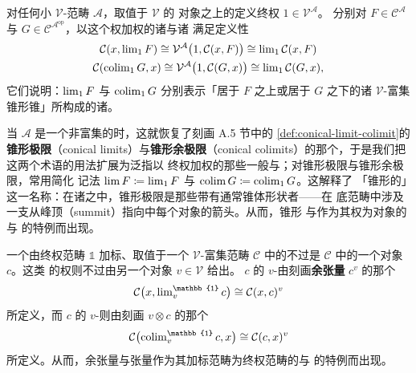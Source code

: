 \begin{example}[锥形极限与余极限]\label{exa:conical-limits-colimits}
对任何小 $\mathcal{V}$-范畴 $\mathcal{A}$，取值于 $\mathcal{V}$ 的%
\trTerminal{}对象之上的\trConstantFunctor{}定义终权 $1\in\mathcal{V}^{\mathcal{A}}$。
分别对\trDiagram{} $F\in\mathcal{C}^{\mathcal{A}}$ 与
$G\in\mathcal{C}^{\mathcal{A}^{\mathrm{op}}}$，以这个权加权的诸\trLimit{}与诸%
\trColimit{}满足定义性\trUniversalProperty
\begin{gather*}
\mathcal{C}(x,\operatorname{lim}_{1}F)\cong\mathcal{V}^{\mathcal{A}}\bigl(1,\mathcal{C}(x,F)\bigr)
  \cong\operatorname{lim}_{1}\mathcal{C}(x,F)\\
\mathcal{C}(\operatorname{colim}_{1}G,x)\cong\mathcal{V}^{\mathcal{A}}\bigl(1,\mathcal{C}(G,x)\bigr)
  \cong\operatorname{lim}_{1}\mathcal{C}(G,x),
\end{gather*}
它们说明：$\operatorname{lim}_{1}F$ 与 $\operatorname{colim}_{1}G$ 分别表示「居于 $F$ 之上或居于 $G$
之下的诸 $\mathcal{V}$-富集锥形锥」所构成的诸\trFunctor。

当 $\mathcal{A}$ 是一个非富集的\trCategory{}时，这就恢复了刻画 A.5 节中的%
\cref{def:conical-limit-colimit}的\textbf{锥形极限}（conical limits）与\textbf{锥形余极限}（conical
colimits）的那个\trUniversalProperty，于是我们把这两个术语的用法扩展为泛指以%
终权加权的那些一般\trLimit{}与\trColimit；对锥形极限与锥形余极限，常用简化%
记法 $\operatorname{lim} F\coloneqq\operatorname{lim}_{1}F$ 与 $\operatorname{colim} G\coloneqq\operatorname{colim}_{1}G$。这解释了
「锥形的」这一名称：在诸\trWeightedLimit{}之中，锥形极限是那些带有通常锥体形状者——在
底范畴中涉及一支从峰顶（summit）指向\trDiagram{}中每个对象的箭头。从而，锥形%
\trLimit{}与\trColimit{}作为其权为\trTerminal{}对象的\trWeightedLimit{}与%
\trWeightedColimit{}的特例而出现。
\end{example}

\begin{example}[张量与余张量]\label{exa:tensors-and-cotensors}
一个由终权范畴 $\mathbb{1}$ 加标、取值于一个 $\mathcal{V}$-富集范畴
$\mathcal{C}$ 中的\trDiagram{}不过是 $\mathcal{C}$ 中的一个对象 $c$。这类%
\trDiagram{}的权则不过由另一个对象 $v\in\mathcal{V}$ 给出。\trDiagram{} $c$ 的
$v$-\trWeightedLimit{}由刻画\textbf{余张量} $c^{v}$ 的那个\trUniversalProperty
\[ \mathcal{C}\bigl(x,\wlim^{\mathbb{1}}_{v}c\bigr)\cong\mathcal{C}(x,c)^{v} \]
所定义，而\trDiagram{} $c$ 的 $v$-\trWeightedColimit{}则由刻画\textbf{\trTensor}
$v\otimes c$ 的那个\trUniversalProperty
\[ \mathcal{C}\bigl(\wcolim^{\mathbb{1}}_{v}c,x\bigr)\cong\mathcal{C}(c,x)^{v} \]
所定义。从而，余张量与张量作为其加标范畴为终权范畴的\trWeightedLimit{}与%
\trWeightedColimit{}的特例而出现。
\end{example}

